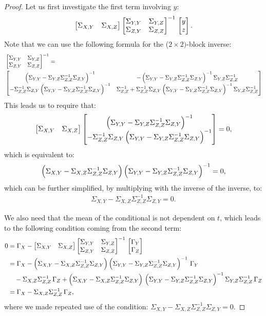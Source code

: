 \begin{proof}
Let us first investigate the first term involving $y$:
\begin{align*}
    \begin{bmatrix}\Sigma_{X,Y}&\Sigma_{X,Z}\end{bmatrix} \begin{bmatrix}\Sigma_{Y,Y}&\Sigma_{Y,Z}\\\Sigma_{Z,Y}&\Sigma_{Z,Z}\end{bmatrix}^{-1}\,\begin{bmatrix}y\\z\end{bmatrix}.
\end{align*}
Note that we can use the following formula for the ($2 \times 2)$-block inverse:
\begin{align*}
  & \begin{bmatrix}\Sigma_{Y,Y}&\Sigma_{Y,Z}\\\Sigma_{Z,Y}&\Sigma_{Z,Z}\end{bmatrix}^{-1}  = \\
  & \begin{bmatrix} \left (\Sigma_{Y,Y}-\Sigma_{Y,Z}\Sigma_{Z,Z}^{-1}\Sigma_{Z,Y}\right )^{-1} & 
    -\left (\Sigma_{Y,Y}-\Sigma_{Y,Z}\Sigma_{Z,Z}^{-1}\Sigma_{Z,Y}\right )^{-1} \Sigma_{Y,Z}\Sigma_{Z,Z}^{-1} \\
    -\Sigma_{Z,Z}^{-1}\Sigma_{Z,Y}\left (\Sigma_{Y,Y}-\Sigma_{Y,Z}\Sigma_{Z,Z}^{-1}\Sigma_{Z,Y}\right )^{-1} &
\Sigma_{Z,Z}^{-1} +\Sigma_{Z,Z}^{-1}\Sigma_{Z,Y}\left (\Sigma_{Y,Y}-\Sigma_{Y,Z}\Sigma_{Z,Z}^{-1}\Sigma_{Z,Y}\right )^{-1}\Sigma_{Y,Z}\Sigma_{Z,Z}^{-1} \end{bmatrix}
\end{align*}
This leads us to require that:
\begin{align*}
 \begin{bmatrix}\Sigma_{X,Y}&\Sigma_{X,Z}\end{bmatrix}   \begin{bmatrix} \left (\Sigma_{Y,Y}-\Sigma_{Y,Z}\Sigma_{Z,Z}^{-1}\Sigma_{Z,Y}\right )^{-1} \\ 
    -\Sigma_{Z,Z}^{-1}\Sigma_{Z,Y}\left (\Sigma_{Y,Y}-\Sigma_{Y,Z}\Sigma_{Z,Z}^{-1}\Sigma_{Z,Y}\right )^{-1}\end{bmatrix} =0,
\end{align*}
which is equivalent to:
\begin{align*}
 \left ( \Sigma_{X,Y} -\Sigma_{X,Z} \Sigma_{Z,Z}^{-1}\Sigma_{Z,Y} \right ) \left (\Sigma_{Y,Y}-\Sigma_{Y,Z}\Sigma_{Z,Z}^{-1}\Sigma_{Z,Y}\right )^{-1}  =0,
\end{align*}
which can be further simplified, by multiplying with the inverse of the inverse, to:
\begin{align*}
     \Sigma_{X,Y} -\Sigma_{X,Z} \Sigma_{Z,Z}^{-1}\Sigma_{Z,Y}   = 0.
\end{align*}

We also need that the mean of the conditional is not dependent on $t$, which leads to the following condition coming from the second term:
\begin{align*}
    0 & = \Gamma_X -  \begin{bmatrix}\Sigma_{X,Y}&\Sigma_{X,Z}\end{bmatrix} \begin{bmatrix}\Sigma_{Y,Y}&\Sigma_{Y,Z}\\\Sigma_{Z,Y}&\Sigma_{Z,Z}\end{bmatrix}^{-1}\,\begin{bmatrix}\Gamma_Y\\\Gamma_Z\end{bmatrix} \\
    & =  \Gamma_X - \left ( \Sigma_{X,Y} -\Sigma_{X,Z} \Sigma_{Z,Z}^{-1}\Sigma_{Z,Y} \right ) \left (\Sigma_{Y,Y}-\Sigma_{Y,Z}\Sigma_{Z,Z}^{-1}\Sigma_{Z,Y}\right )^{-1} \, \Gamma_Y \\
    & \quad -  \Sigma_{X,Z}  \Sigma_{Z,Z}^{-1} \, \Gamma_Z 
 + \left ( \Sigma_{X,Y} - \Sigma_{X,Z} \Sigma_{Z,Z}^{-1}\Sigma_{Z,Y}\right )\,\left (\Sigma_{Y,Y}-\Sigma_{Y,Z}\Sigma_{Z,Z}^{-1}\Sigma_{Z,Y}\right )^{-1} \Sigma_{Y,Z}\Sigma_{Z,Z}^{-1} \, \Gamma_Z \\
 &= \Gamma_X - \Sigma_{X,Z}\Sigma_{Z,Z}^{-1}\,\Gamma_Z,
\end{align*}
where we made repeated use of the condition: $\Sigma_{X,Y} - \Sigma_{X,Z} \Sigma_{Z,Z}^{-1}\Sigma_{Z,Y} =0$.


\end{proof}
